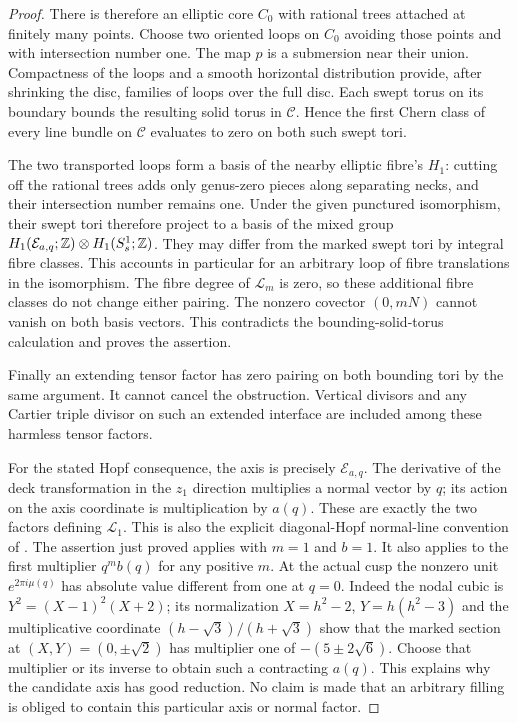 \begin{proof}
There is therefore an elliptic core $C_0$ with rational
trees attached at finitely many points.  Choose two
oriented loops on $C_0$ avoiding those points and with
intersection number one.  The map $p$ is a submersion
near their union.  Compactness of the loops and a smooth
horizontal distribution provide, after shrinking the
disc, families of loops over the full disc.  Each swept
torus on its boundary bounds the resulting solid torus
in $\mathcal C$.  Hence the first Chern class of every
line bundle on $\mathcal C$ evaluates to zero on both
such swept tori.

The two transported loops form a basis of the nearby
elliptic fibre's $H_1$: cutting off the rational trees
adds only genus-zero pieces along separating necks,
and their intersection number remains one.  Under the
given punctured isomorphism, their swept tori therefore
project to a basis of the mixed group
$H_1(\mathcal E_{a,q};\mathbb Z)\otimes H_1(S_s^1;\mathbb Z)$.
They may differ from the marked swept tori by integral
fibre classes.  This accounts in particular for an
arbitrary loop of fibre translations in the isomorphism.
The fibre degree of $\mathcal L_m$ is zero, so these
additional fibre classes do not change either pairing.
The nonzero covector $(0,mN)$ cannot vanish on both
basis vectors.  This contradicts the bounding-solid-torus
calculation and proves the assertion.

Finally an extending tensor factor has zero pairing on
both bounding tori by the same argument.  It cannot
cancel the obstruction.  Vertical divisors and any
Cartier triple divisor on such an extended interface
are included among these harmless tensor factors.

For the stated Hopf consequence, the axis is precisely
$\mathcal E_{a,q}$.
The derivative of the deck transformation in the $z_1$
direction multiplies a normal vector by $q$; its action
on the axis coordinate is multiplication by $a(q)$.
These are exactly the two factors defining
$\mathcal L_1$.  This is also the explicit diagonal-Hopf
normal-line convention of
\citet[Section 2.2]{AbashevaDeev2024AB}.
The assertion just proved applies with $m=1$ and $b=1$.
It also applies to the first multiplier $q^m b(q)$ for
any positive $m$.  At the actual cusp the nonzero unit
$e^{2\pi i\mu(q)}$ has absolute value different from one
at $q=0$.  Indeed the nodal cubic is
$Y^2=(X-1)^2(X+2)$; its normalization
$X=h^2-2$, $Y=h(h^2-3)$ and the multiplicative coordinate
$(h-\sqrt3)/(h+\sqrt3)$ show that the marked section at
$(X,Y)=(0,\pm\sqrt2)$ has multiplier one of
$-(5\pm2\sqrt6)$.
Choose that multiplier or its inverse to obtain
such a contracting $a(q)$.
This explains why the candidate axis has good reduction.
No claim is made that an arbitrary filling is obliged
to contain this particular axis or normal factor.
\end{proof}

